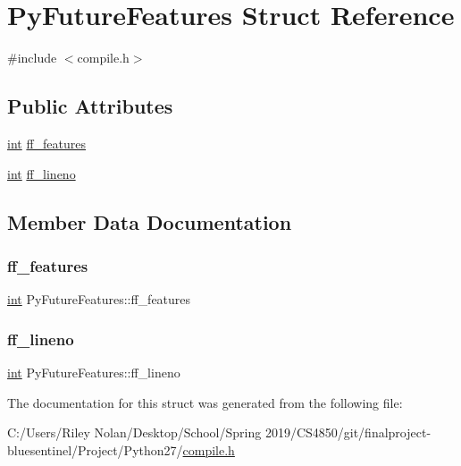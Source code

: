 \hypertarget{struct_py_future_features}{}\section{Py\+Future\+Features Struct Reference}
\label{struct_py_future_features}


{\ttfamily \#include $<$compile.\+h$>$}

\subsection*{Public Attributes}
\begin{DoxyCompactItemize}
\item 
\mbox{\hyperlink{warnings_8h_a74f207b5aa4ba51c3a2ad59b219a423b}{int}} \mbox{\hyperlink{struct_py_future_features_ae87ffcf41926116dcd91cfcee3608ba3}{ff\+\_\+features}}
\item 
\mbox{\hyperlink{warnings_8h_a74f207b5aa4ba51c3a2ad59b219a423b}{int}} \mbox{\hyperlink{struct_py_future_features_acef68f58394a40dbdac8c00229d2b317}{ff\+\_\+lineno}}
\end{DoxyCompactItemize}


\subsection{Member Data Documentation}
\mbox{\label{struct_py_future_features_ae87ffcf41926116dcd91cfcee3608ba3}} 
\subsubsection{\texorpdfstring{ff\_features}{ff\_features}}
{\footnotesize\ttfamily \mbox{\hyperlink{warnings_8h_a74f207b5aa4ba51c3a2ad59b219a423b}{int}} Py\+Future\+Features\+::ff\+\_\+features}

\mbox{\label{struct_py_future_features_acef68f58394a40dbdac8c00229d2b317}} 
\subsubsection{\texorpdfstring{ff\_lineno}{ff\_lineno}}
{\footnotesize\ttfamily \mbox{\hyperlink{warnings_8h_a74f207b5aa4ba51c3a2ad59b219a423b}{int}} Py\+Future\+Features\+::ff\+\_\+lineno}



The documentation for this struct was generated from the following file\+:\begin{DoxyCompactItemize}
\item 
C\+:/\+Users/\+Riley Nolan/\+Desktop/\+School/\+Spring 2019/\+C\+S4850/git/finalproject-\/bluesentinel/\+Project/\+Python27/\mbox{\hyperlink{compile_8h}{compile.\+h}}\end{DoxyCompactItemize}
